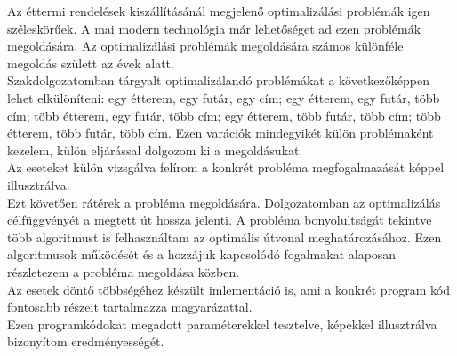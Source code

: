 
Az éttermi rendelések kiszállításánál megjelenő optimalizálási problémák igen széleskörűek. A mai modern technológia már lehetőséget ad ezen problémák megoldására. Az optimalizálási problémák megoldására számos különféle megoldás születt az évek alatt. \\
Szakdolgozatomban tárgyalt optimalizálandó problémákat a következőképpen lehet elkülöníteni: egy étterem, egy futár, egy cím; egy étterem, egy futár, több cím; több étterem, egy futár, több cím; egy étterem, több futár, több cím; több étterem, több futár, több cím. Ezen varációk mindegyikét külön problémaként kezelem, külön eljárással dolgozom ki a megoldásukat. \\
Az eseteket külön vizsgálva felírom a konkrét probléma megfogalmazását képpel illusztrálva. \\ 
Ezt követően rátérek a probléma megoldására. Dolgozatomban az optimalizálás célfüggvényét a megtett út hossza jelenti. A probléma bonyolultságát tekintve több algoritmust is felhasználtam az optimális útvonal meghatározásához. Ezen algoritmusok működését és a hozzájuk kapcsolódó fogalmakat alaposan részletezem a probléma megoldása közben. \\
Az esetek döntő többségéhez készült imlementáció is, ami a konkrét program kód fontosabb részeit tartalmazza magyarázattal. \\
Ezen programkódokat megadott paraméterekkel tesztelve, képekkel illusztrálva bizonyítom eredményességét.

